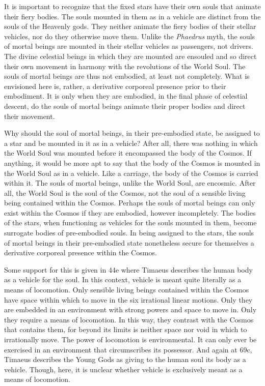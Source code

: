 It is important to recognize that the fixed stars have their own souls that animate their fiery bodies. The souls mounted in them as in a vehicle are distinct from the souls of the Heavenly gods. They neither animate the fiery bodies of their stellar vehicles, nor do they otherwise move them. Unlike the \emph{Phaedrus} myth, the souls of mortal beings are mounted in their stellar vehicles as passengers, not drivers. The divine celestial beings in which they are mounted are ensouled and so direct their own movement in harmony with the revolutions of the World Soul. The souls of mortal beings are thus not embodied, at least not completely. What is envisioned here is, rather, a derivative corporeal presence prior to their embodiment. It is only when they are embodied, in the final phase of celestial descent, do the souls of mortal beings animate their proper bodies and direct their movement.

Why should the soul of mortal beings, in their pre-embodied state, be assigned to a star and be mounted in it as in a vehicle? After all, there was nothing in which the World Soul was mounted before it encompassed the body of the Cosmos. If anything, it would be more apt to say that the body of the Cosmos is mounted in the World Soul as in a vehicle. Like a carriage, the body of the Cosmos is carried within it. The souls of mortal beings, unlike the World Soul, are encosmic. After all, the World Soul is the soul of the Cosmos, not the soul of a sensible living being contained within the Cosmos. Perhaps the souls of mortal beings can only exist within the Cosmos if they are embodied, however incompletely. The bodies of the stars, when functioning as vehicles for the souls mounted in them, become surrogate bodies of pre-embodied souls. In being assigned to the stars, the souls of mortal beings in their pre-embodied state nonetheless secure for themselves a derivative corporeal presence within the Cosmos. 

Some support for this is given in 44e where Timaeus describes the human body as a vehicle for the soul. In this context, vehicle is meant quite literally as a means of locomotion. Only sensible living beings contained within the Cosmos have space within which to move in the six irrational linear motions. Only they are embedded in an environment with strong powers and space to move in. Only they require a means of locomotion. In this way, they contrast with the Cosmos that contains them, for beyond its limits is neither space nor void in which to irrationally move. The power of locomotion is environmental. It can only ever be exercised in an environment that circumscribes its possessor. And again at 69c, Timaeus describes the Young Gods as giving to the human soul its body as a vehicle. Though, here, it is unclear whether vehicle is exclusively meant as a means of locomotion.

